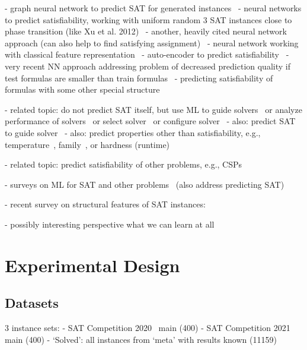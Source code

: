 \documentclass{article}
\begin{document}
- graph neural network to predict SAT for generated instances~\cite{bunz2017graph}
- neural networks to predict satisfiability, working with uniform random 3 SAT instances close to phase transition (like Xu et al. 2012)~\cite{cameron2020predicting}
- another, heavily cited neural network approach (can also help to find satisfying assignment)~\cite{selsam2019learning}
- neural network working with classical feature representation~\cite{danisovszky2020classification}
- auto-encoder to predict satisfiability~\cite{dalla2021automated}
- very recent NN approach addressing problem of decreased prediction quality if test formulas are smaller than train formulas~\cite{zhang2022towards}
- predicting satisfiability of formulas with some other special structure~\cite{elhalaby2020learning}

- related topic: do not predict SAT itself, but use ML to guide solvers~\cite{amizadeh2019pdp, soos2019crystal, selsam2019guiding, zhang2021nlocalsat} or analyze performance of solvers~\cite{hutter2013identifying} or select solver~\cite{xu2012satzilla2012, bach2022comprehensive} or configure solver~\cite{hoos2021automated}
- also: predict SAT to guide solver~\cite{wu2017improving}
- also: predict properties other than satisfiability, e.g., temperature~\cite{giraldez2021temperature}, family~\cite{ansotegui2017structure, li2021hierarchical}, or hardness (runtime)~\cite{nudelman2004understanding, xu2007hierarchical, li2021hierarchical}

- related topic: predict satisfiability of other problems, e.g., CSPs~\cite{xu2018towards, liu2020learning, toenshoff2021graph}

- surveys on ML for SAT and other problems~\cite{amrani2018ml, popescu2022overview, guo2022machine} (also address predicting SAT)

- recent survey on structural features of SAT instances: \cite{alyahya2022structure}

- possibly interesting perspective what we can learn at all~\cite{yehuda2020its}

\section{Experimental Design}
\label{sec:experimental-design}

\subsection{Datasets}

3 instance sets:
- SAT Competition 2020~\cite{balyo2020proceedings} main (400)
- SAT Competition 2021~\cite{balyo2021proceedings} main (400)
- `Solved': all instances from `meta' with results known (11159)
\end{document}
